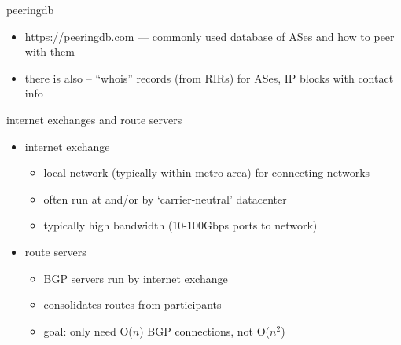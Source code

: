 

\begin{frame}{peeringdb}
    \begin{itemize}
    \item \url{https://peeringdb.com} --- commonly used database of ASes and how to peer with them
    \item there is also -- ``whois'' records (from RIRs) for ASes, IP blocks with contact info
    \end{itemize}
\end{frame}

\begin{frame}{internet exchanges and route servers}
    \begin{itemize}
    \item internet exchange
        \begin{itemize}
        \item local network (typically within metro area) for connecting networks
        \item often run at and/or by `carrier-neutral' datacenter
        \item typically high bandwidth (10-100Gbps ports to network)
        \end{itemize}
    \vspace{.5cm}
    \item route servers
        \begin{itemize}
        \item BGP servers run by internet exchange
        \item consolidates routes from participants
        \item goal: only need O($n$) BGP connections, not O($n^2$)
        \end{itemize}
    \end{itemize}
\end{frame}
